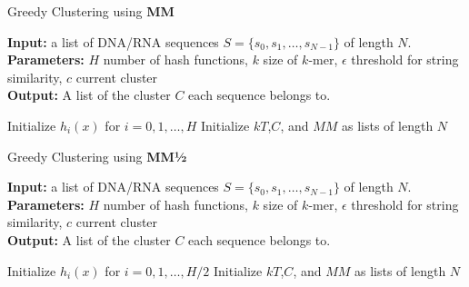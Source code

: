 \documentclass[../../main.tex]{subfiles}
\begin{document}
\begin{algorithm}
\caption{Greedy Clustering using {\bf MM}}\label{alg:minmaxclust}
\textbf{Input:} a list of DNA/RNA sequences $S=\{s_0,s_1,\ldots,s_{N-1}\}$ of length $N$.\\
\textbf{Parameters:} $H$ number of hash functions, $k$ size of $k$-mer,	$\epsilon$ threshold for string similarity, $c$ current cluster \\
\textbf{Output:} A list of the cluster $C$ each sequence belongs to.
\begin{algorithmic}[1]
\State Initialize $h_i(x)$ for $i=0,1,\ldots,H$
\State Initialize $kT$,$C$, and $MM$ as lists of length $N$
\EndFor
{}
					\Else
						\EndIf
					\EndIf
				\EndFor
				\EndIf
			\EndIf
		\EndFor
	\EndIf
\EndFor
\end{algorithmic}
\end{algorithm}

\begin{algorithm}
\caption{Greedy Clustering using {\bf MM½}}\label{alg:minmaxhalfclust}
\textbf{Input:} a list of DNA/RNA sequences $S=\{s_0,s_1,\ldots,s_{N-1}\}$ of length $N$.\\
\textbf{Parameters:} $H$ number of hash functions, $k$ size of $k$-mer,	$\epsilon$ threshold for string similarity, $c$ current cluster \\
\textbf{Output:} A list of the cluster $C$ each sequence belongs to.
\begin{algorithmic}[1]
\State Initialize $h_i(x)$ for $i=0,1,\ldots,H/2$
\State Initialize $kT$,$C$, and $MM$ as lists of length $N$
\EndFor
{}
					\EndIf
					\EndIf
				\EndFor
				\EndIf
			\EndIf
		\EndFor
	\EndIf
\EndFor
\end{algorithmic}
\end{algorithm}
\newpage
\end{document}
